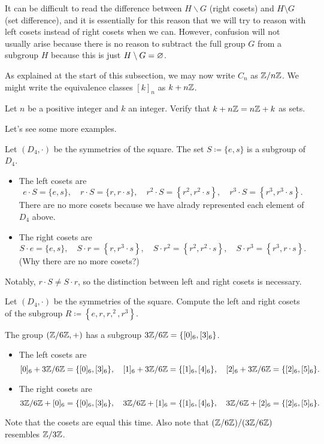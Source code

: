 \documentclass[../main.tex]{subfiles}
\begin{document}
It can be difficult to read the difference between $H\backslash G$ (right cosets) and $H\setminus G$ (set difference), and it is essentially for this reason that we will try to reason with left cosets instead of right cosets when we can. However, confusion will not usually arise because there is no reason to subtract the full group $G$ from a subgroup $H$ because this is just $H\setminus G=\varnothing$.
\begin{notation}
    As explained at the start of this subsection, we may now write $C_n$ as $\mathbb Z/n\mathbb Z$. We might write the equivalence classes $[k]_n$ as $k+n\mathbb Z$.
\end{notation}
\begin{exe} \label{exe:nz-is-normal}
    Let $n$ be a positive integer and $k$ an integer. Verify that $k+n\mathbb Z=n\mathbb Z+k$ as sets.
\end{exe}
Let's see some more examples.
\begin{example} \label{ex:d4-cosets}
    Let $(D_4,\cdot)$ be the symmetries of the square. The set $S\coloneqq\{e,s\}$ is a subgroup of $D_4$.
    \begin{itemize}
        \item The left cosets are
        \[e\cdot S=\{e,s\},\quad r\cdot S=\{r,r\cdot s\},\quad r^2\cdot S=\left\{r^2,r^2\cdot s\right\},\quad r^3\cdot S=\left\{r^3,r^3\cdot s\right\}.\]
        There are no more cosets because we have alrady represented each element of $D_4$ above.
        \item The right cosets are
        \[S\cdot e=\{e,s\},\quad S\cdot r=\left\{r,r^3\cdot s\right\},\quad S\cdot r^2=\left\{r^2,r^2\cdot s\right\},\quad S\cdot r^3=\left\{r^3,r\cdot s\right\}.\]
        (Why there are no more cosets?)
    \end{itemize}
    Notably, $r\cdot S\ne S\cdot r$, so the distinction between left and right cosets is necessary.
\end{example}
\begin{exe}
    Let $(D_4,\cdot)$ be the symmetries of the square. Compute the left and right cosets of the subgroup $R\coloneqq\left\{e,r,r,^2,r^3\right\}$.
\end{exe}
\begin{example} \label{ex:double-quotient}
    The group $(\mathbb Z/6\mathbb Z,+)$ has a subgroup $3\mathbb Z/6\mathbb Z=\{[0]_6,[3]_6\}$.
    \begin{itemize}
        \item The left cosets are
        \[[0]_6+3\mathbb Z/6\mathbb Z=\{[0]_6,[3]_6\},\quad[1]_6+3\mathbb Z/6\mathbb Z=\{[1]_6,[4]_6\},\quad[2]_6+3\mathbb Z/6\mathbb Z=\{[2]_6,[5]_6\}.\]
        \item The right cosets are
        \[3\mathbb Z/6\mathbb Z+[0]_6=\{[0]_6,[3]_6\},\quad3\mathbb Z/6\mathbb Z+[1]_6=\{[1]_6,[4]_6\},\quad3\mathbb Z/6\mathbb Z+[2]_6=\{[2]_6,[5]_6\}.\]
    \end{itemize}
    Note that the cosets are equal this time. Also note that $(\mathbb Z/6\mathbb Z)/(3\mathbb Z/6\mathbb Z)$ resembles $\mathbb Z/3\mathbb Z$.
\end{example}
\end{document}
